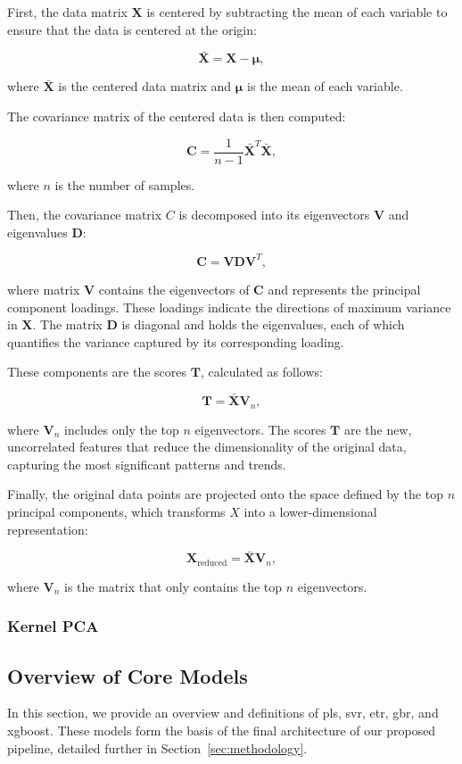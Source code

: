 First, the data matrix $\mathbf{X}$ is centered by subtracting the mean of each variable to ensure that the data is centered at the origin:

$$
\mathbf{\bar{X}} = \mathbf{X} - \mathbf{\mu},
$$

where $\mathbf{\bar{X}}$ is the centered data matrix and $\mathbf{\mu}$ is the mean of each variable.

The covariance matrix of the centered data is then computed:

$$
\mathbf{C} = \frac{1}{n-1} \mathbf{\bar{X}}^T \mathbf{\bar{X}},
$$

where $n$ is the number of samples.

Then, the covariance matrix $C$ is decomposed into its eigenvectors $\mathbf{V}$ and eigenvalues $\mathbf{D}$:

$$
\mathbf{C} = \mathbf{V} \mathbf{D} \mathbf{V}^T,
$$

where matrix $\mathbf{V}$ contains the eigenvectors of $\mathbf{C}$ and represents the principal component loadings.
These loadings indicate the directions of maximum variance in $\mathbf{X}$.
The matrix $\mathbf{D}$ is diagonal and holds the eigenvalues, each of which quantifies the variance captured by its corresponding loading.

These components are the scores $\mathbf{T}$, calculated as follows:

$$
\mathbf{T} = \mathbf{\bar{X}} \mathbf{V}_n,
$$

where $\mathbf{V}_n$ includes only the top $n$ eigenvectors.
The scores $\mathbf{T}$ are the new, uncorrelated features that reduce the dimensionality of the original data, capturing the most significant patterns and trends.

Finally, the original data points are projected onto the space defined by the top $n$ principal components, which transforms $X$ into a lower-dimensional representation:

$$
\mathbf{X}_{\text{reduced}} = \mathbf{\bar{X}} \mathbf{V}_n,
$$

where $\mathbf{V}_n$ is the matrix that only contains the top $n$ eigenvectors.

\subsubsection{Kernel PCA}

\subsection{Overview of Core Models}
In this section, we provide an overview and definitions of \gls{pls}, \gls{svr}, \gls{etr}, \gls{gbr}, and \gls{xgboost}.
These models form the basis of the final architecture of our proposed pipeline, detailed further in Section~\ref{sec:methodology}.

